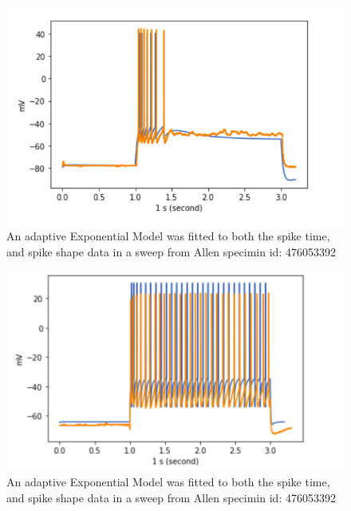 \begin{figure}
    \centering
    \includegraphics[scale=1]{figures/adexp_fit_allen_spec_id_476053392.png}
    \caption[Optimized AdEx model from Allen Cell Types (A)]{An adaptive Exponential Model was fitted to both the spike time, and spike shape data in a sweep from Allen specimin id: 476053392}
    \label{fig:specimen_476053392_A}
\end{figure}

\begin{figure}
    \centering
    \includegraphics[scale=1]{figures/28spikesB95}
    \caption[Optimized AdEx model from Allen Cell Types (B)]{An adaptive Exponential Model was fitted to both the spike time, and spike shape data in a sweep from Allen specimin id: 476053392}
    \label{fig:specimen_476053392_B}
\end{figure}


